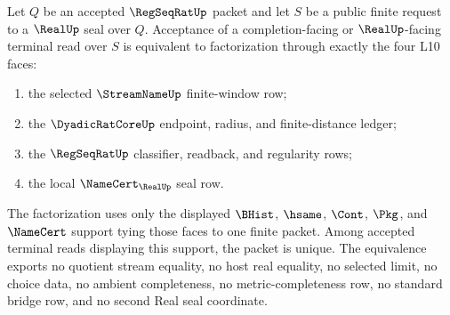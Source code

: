 \begin{theorem}
\label{thm:real-regseqrat-terminal-four-face-acceptance-equivalence}
Let $Q$ be an accepted $\RegSeqRatUp$ packet and let $S$ be a public finite request to a $\RealUp$ seal over $Q$. Acceptance of a completion-facing or $\RealUp$-facing terminal read over $S$ is equivalent to factorization through exactly the four L10 faces:
\begin{enumerate}
\item the selected $\StreamNameUp$ finite-window row;
\item the $\DyadicRatCoreUp$ endpoint, radius, and finite-distance ledger;
\item the $\RegSeqRatUp$ classifier, readback, and regularity rows;
\item the local $\NameCert_{\RealUp}$ seal row.
\end{enumerate}
The factorization uses only the displayed $\BHist$, $\hsame$, $\Cont$, $\Pkg$, and $\NameCert$ support tying those faces to one finite packet. Among accepted terminal reads displaying this support, the packet is unique. The equivalence exports no quotient stream equality, no host real equality, no selected limit, no choice data, no ambient completeness, no metric-completeness row, no standard bridge row, and no second Real seal coordinate.
\end{theorem}
